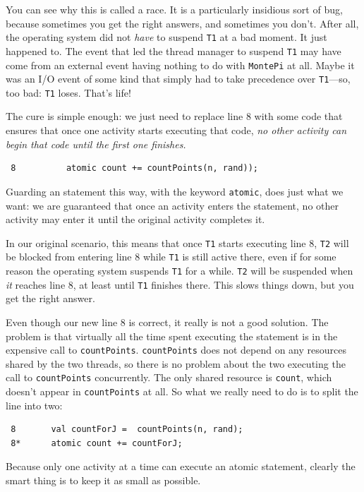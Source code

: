You can see why this is called a race. It is a particularly insidious sort of bug,
because sometimes you get the right answers, and sometimes you don't.
After all, the operating system did not {\em have} to suspend {\tt T1} at a
bad moment.  It just happened to.  The event that led the thread manager
to suspend {\tt T1} may have come from an external event having nothing to
do with {\tt MontePi} at all.  Maybe it was an I/O event of some kind
that simply had to take precedence over {\tt T1}---so, too bad: {\tt T1} loses.
That's life!

The cure is simple enough: we just need to replace line 8 with some code
that ensures that once one activity starts executing that code, {\em no other
activity can begin that code until the first one finishes.}
\begin{verbatim}
 8          atomic count += countPoints(n, rand));
\end{verbatim}
Guarding an \Xten{} statement this way, with the keyword {\tt atomic},
does just what we want: we are guaranteed that once an activity enters the
statement, no other activity may enter it until the original activity
completes it.

In our original scenario, this means that once {\tt T1}
starts executing line 8,  {\tt T2} will be blocked from entering
line 8 while {\tt T1} is still active there, even if for some reason the
operating system suspends {\tt T1} for a while.  {\tt T2} will be
suspended when {\em it} reaches line 8, at least until {\tt T1} finishes there.
This slows things down, but you get the right answer.

Even though our new line 8 is correct, it really is not a good solution.
The problem is that virtually all the time spent executing the statement is
in the expensive call to {\tt countPoints}.  {\tt countPoints}
does not depend on any resources shared by the two threads,
so there is no problem about the
two executing the call to {\tt countPoints} concurrently.
The only shared resource is {\tt count}, which
doesn't appear in {\tt countPoints} at all.  So what we really need
to do is to split the line into two:
\begin{verbatim}
 8       val countForJ =  countPoints(n, rand);
 8*      atomic count += countForJ;
\end{verbatim}
Because only one activity at a time can execute an atomic statement,
clearly the smart thing is to keep it as small as possible.

